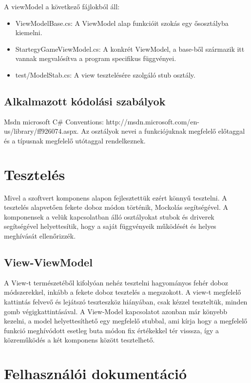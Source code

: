 \documentclass[a4paper,12pt]{report}
\begin{document}
A viewModel a következő fájlokból áll:
\begin{itemize}
\item ViewModelBase.cs: A ViewModel alap funkcióit szokás egy ősosztályba kiemelni. 
\item StartegyGameViewModel.cs: A konkrét ViewModel, a base-ből származik itt vannak megvalósítva a program specifikus függvényei.
\item test/ModelStab.cs: A view tesztelésére szolgáló stub osztály.
\end{itemize}

\section{Alkalmazott kódolási szabályok}

Msdn microsoft C\# Conventions: http://msdn.microsoft.com/en-us/library/ff926074.aspx. Az osztályok nevei a funkciójuknak megfelelő előtaggal és a típusnak megfelelő utótaggal rendelkeznek.

\chapter{Tesztelés}

Mivel a szoftvert komponens alapon fejlesztettük ezért könnyű tesztelni. A tesztelés alapvetően fekete doboz módon történik, Mockolás segítségével. A komponensek a velük kapcsolatban álló osztályokat stubok és driverek segítségével helyettesítik, hogy a saját függvényeik működését és helyes meghívását ellenőrizzék.

\section{View-ViewModel}

A View-t természetéből kifolyóan nehéz tesztelni hagyományos fehér doboz módszerekkel, inkább a fekete doboz tesztelés a megszokott. A view-t megfelelő kattintás felvevő és lejátszó teszteszköz hiányában, csak kézzel teszteltük, minden gomb végigkattintásával. A View-Model kapcsolatot azonban már könyebb kezelni, a model helyettesíthető egy megfelelő stubbal, ami kírja hogy a megfelelő funkció meghívódott esetleg buta módon fix értékekkel tér visssza, így a közreműködés a két komponens között tesztelhető.

\chapter{Felhasználói dokumentáció}
\end{document}
